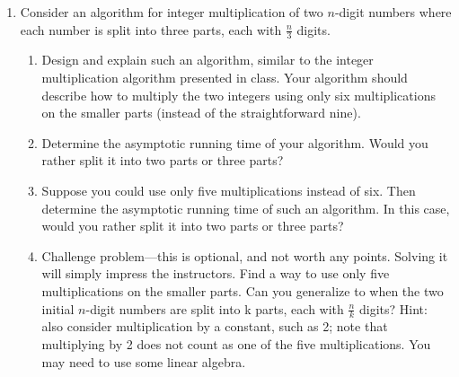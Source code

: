 \documentclass[11pt]{article}
\begin{document}
\begin{enumerate}
\item Consider an algorithm for integer multiplication of two $n$-digit numbers where each number is split into three parts, each with $\frac{n}{3}$ digits.
\begin{enumerate}[label=(\alph*)]
\item Design and explain such an algorithm, similar to the integer multiplication algorithm presented in class. Your algorithm should describe how to multiply the two integers using only six multiplications on the smaller parts (instead of the straightforward nine).
\item Determine the asymptotic running time of your algorithm. Would you rather split it into two parts or three parts?
\item Suppose you could use only five multiplications instead of six. Then determine the asymptotic running time of such an algorithm. In this case, would you rather split it into two parts or three parts?
\item Challenge problem---this is optional, and not worth any points. Solving it will simply impress the instructors. Find a way to use only five multiplications on the smaller parts. Can you generalize to when the two initial $n$-digit numbers are split into k parts, each with $\frac{n}{k}$ digits? Hint: also consider multiplication by a constant, such as 2; note that multiplying by 2 does not count as one of the five multiplications. You may need to use some linear algebra.
\end{enumerate}


\end{enumerate}
\end{document}
